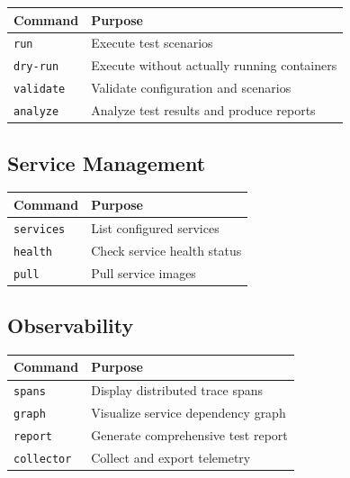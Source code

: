 \documentclass[12pt,twoside,openright]{book}
\theoremstyle{plain}
\theoremstyle{definition}
\theoremstyle{remark}
\begin{document}
\begin{table}[H]
\centering
\begin{tabular}{|l|p{5cm}|}
\hline
\textbf{Command} & \textbf{Purpose} \\
\hline
\texttt{run} & Execute test scenarios \\
\hline
\texttt{dry-run} & Execute without actually running containers \\
\hline
\texttt{validate} & Validate configuration and scenarios \\
\hline
\texttt{analyze} & Analyze test results and produce reports \\
\hline
\end{tabular}
\end{table}

\subsection{Service Management}

\begin{table}[H]
\centering
\begin{tabular}{|l|p{5cm}|}
\hline
\textbf{Command} & \textbf{Purpose} \\
\hline
\texttt{services} & List configured services \\
\hline
\texttt{health} & Check service health status \\
\hline
\texttt{pull} & Pull service images \\
\hline
\end{tabular}
\end{table}

\subsection{Observability}

\begin{table}[H]
\centering
\begin{tabular}{|l|p{5cm}|}
\hline
\textbf{Command} & \textbf{Purpose} \\
\hline
\texttt{spans} & Display distributed trace spans \\
\hline
\texttt{graph} & Visualize service dependency graph \\
\hline
\texttt{report} & Generate comprehensive test report \\
\hline
\texttt{collector} & Collect and export telemetry \\
\hline
\end{tabular}
\end{table}
\end{document}
